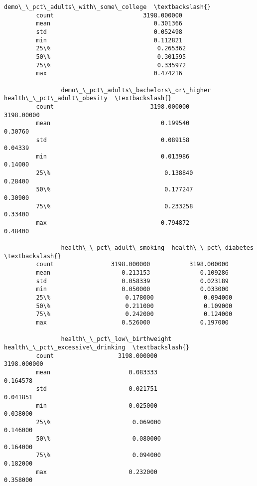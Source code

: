 \documentclass[11pt]{article}
\begin{document}
\begin{Verbatim}[commandchars=\\\{\}]
                demo\_\_pct\_adults\_with\_some\_college  \textbackslash{}
         count                         3198.000000   
         mean                             0.301366   
         std                              0.052498   
         min                              0.112821   
         25\%                              0.265362   
         50\%                              0.301595   
         75\%                              0.335972   
         max                              0.474216   
         
                demo\_\_pct\_adults\_bachelors\_or\_higher  health\_\_pct\_adult\_obesity  \textbackslash{}
         count                           3198.000000                 3198.00000   
         mean                               0.199540                    0.30760   
         std                                0.089158                    0.04339   
         min                                0.013986                    0.14000   
         25\%                                0.138840                    0.28400   
         50\%                                0.177247                    0.30900   
         75\%                                0.233258                    0.33400   
         max                                0.794872                    0.48400   
         
                health\_\_pct\_adult\_smoking  health\_\_pct\_diabetes  \textbackslash{}
         count                3198.000000           3198.000000   
         mean                    0.213153              0.109286   
         std                     0.058339              0.023189   
         min                     0.050000              0.033000   
         25\%                     0.178000              0.094000   
         50\%                     0.211000              0.109000   
         75\%                     0.242000              0.124000   
         max                     0.526000              0.197000   
         
                health\_\_pct\_low\_birthweight  health\_\_pct\_excessive\_drinking  \textbackslash{}
         count                  3198.000000                     3198.000000   
         mean                      0.083333                        0.164578   
         std                       0.021751                        0.041851   
         min                       0.025000                        0.038000   
         25\%                       0.069000                        0.146000   
         50\%                       0.080000                        0.164000   
         75\%                       0.094000                        0.182000   
         max                       0.232000                        0.358000   
         

\end{Verbatim}
\end{document}
